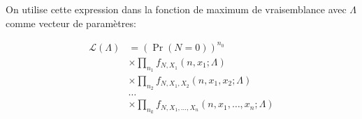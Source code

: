\documentclass{article}
\begin{document}
	On utilise cette expression dans la fonction de maximum de vraisemblance avec $\Lambda$ comme vecteur de paramètres:
	
	\begin{align*}
	 \mathcal{L}(\Lambda) &= \left( \Pr (N=0)\right)^{n_0} \\
	 & \times \prod_{n_1}^{} f_{N,X_1}(n,x_1;\Lambda)\\
	 & \times \prod_{n_2}^{} f_{N,X_1,X_2}(n,x_1,x_2;\Lambda)\\
	 & \dots\\
	 & \times \prod_{n_k}^{} f_{N,X_1,\dots,X_n}(n,x_1,\dots,x_n;\Lambda)
	\end{align*}
	
	
\end{document}
